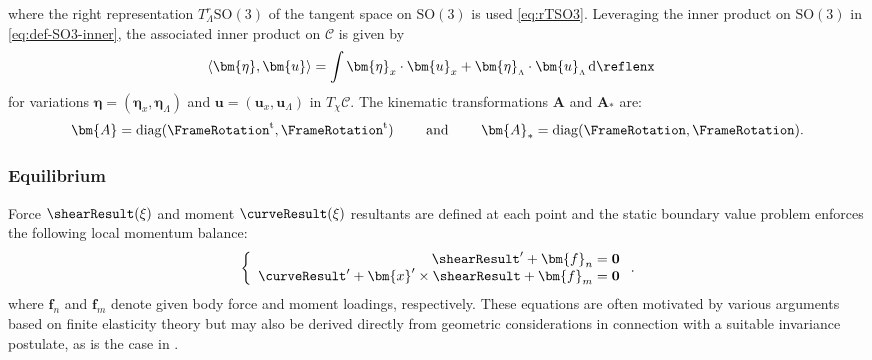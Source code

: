 where the right representation \(T_{\scriptscriptstyle{\Lambda}}^r \mathrm{SO}(3)\) of the tangent space on \(\mathrm{SO}(3)\) is used \eqref{eq:rTSO3}.
Leveraging the inner product on \(\mathrm{SO}(3)\)
in \eqref{eq:def-SO3-inner}, the associated inner product on
\(\mathscr{C}\) is given by
\begin{equation} 
\begin{aligned}
\left\langle \bm{\eta}, \bm{u}\right\rangle 
& =\int  \bm{\eta}_x \cdot \bm{u}_x + \bm{\eta}_{\scriptscriptstyle{\Lambda}} \cdot \bm{u}_{\scriptscriptstyle{\Lambda}} \, \mathrm{d}\reflenx
\end{aligned}
\label{eq:rod-inner}
\end{equation}
for variations
\(\bm{\eta}=(\bm{\eta}_x, \bm{\eta}_{\scriptscriptstyle{\Lambda}})\)
and
\(\bm{u}=(\bm{u}_x, \bm{u}_{\scriptscriptstyle{\Lambda}})\)
in \(T_\chi \mathscr{C}\).
The kinematic transformations $\bm{A}$ and $\bm{A}_*$ are:
\begin{equation}
\bm{A} = \operatorname{diag}(\FrameRotation^{\mathrm{t}}, \FrameRotation^{\mathrm{t}})
\qquad\text{ and }\qquad
\bm{A}_* = \operatorname{diag}(\FrameRotation, \FrameRotation).
\label{eq:cosserat-pull}
\end{equation}


\subsubsection{Equilibrium}

Force \(\shearResult(\xi)\) and moment \(\curveResult(\xi)\)
resultants are defined at each point and the static boundary value
problem enforces the following local momentum balance:
\begin{equation} 
\left\{\begin{array}{r}
\shearResult^{\prime}+{\bm{f}}_n=\mathbf{0} \\
\curveResult^{\prime}+\bm{x}^{\prime} \times \shearResult+{\bm{f}}_m=\mathbf{0} 
\end{array}\right. .
\end{equation}
where \(\bm{f}_n\) and \(\bm{f}_m\) denote given body force and moment loadings, respectively. 
These equations are often motivated by various arguments based on  
finite elasticity theory but 
may also be derived directly from geometric
considerations in connection  %
with a suitable invariance postulate, as is the case in  %
\cite{cosserat1909theorie}.


